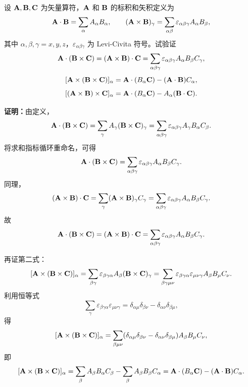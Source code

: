 \documentclass[12pt,a4paper]{article}
\begin{document}
\section{}
设 \(\vb{A},\vb{B},\vb{C}\) 为矢量算符，\(\vb{A}\) 和 \(\vb{B}\) 的标积和矢积定义为
\[
\vb{A}\cdot \vb{B}=\sum_{\alpha}A_{\alpha}B_{\alpha},
\qquad
(\vb{A}\times \vb{B})_{\gamma}=\sum_{\alpha\beta}\varepsilon_{\alpha\beta\gamma}A_{\alpha}B_{\beta},
\]
其中 \(\alpha,\beta,\gamma=x,y,z\)，\(\varepsilon_{\alpha\beta\gamma}\) 为 Levi-Civita 符号。试验证
\[
\vb{A}\cdot (\vb{B}\times \vb{C})=(\vb{A}\times \vb{B})\cdot \vb{C}=\sum_{\alpha\beta\gamma}\varepsilon_{\alpha\beta\gamma}A_{\alpha}B_{\beta}C_{\gamma},
\]
\[
[\vb{A}\times (\vb{B}\times \vb{C})]_{\alpha}=\vb{A}\cdot(B_{\alpha}\vb{C})-(\vb{A}\cdot \vb{B})C_{\alpha},
\]
\[
[(\vb{A}\times \vb{B})\times \vb{C}]_{\alpha}=\vb{A}\cdot(B_{\alpha}\vb{C})-A_{\alpha}(\vb{B}\cdot \vb{C}).
\]

\vspace{0.5cm}

\noindent\textbf{证明：}由定义，
\[
\vb{A}\cdot (\vb{B}\times \vb{C})
=
\sum_{\gamma}A_{\gamma}(\vb{B}\times \vb{C})_{\gamma}
=
\sum_{\alpha\beta\gamma}\varepsilon_{\alpha\beta\gamma}A_{\gamma}B_{\alpha}C_{\beta}.
\]
将求和指标循环重命名，可得
\[
\vb{A}\cdot (\vb{B}\times \vb{C})
=
\sum_{\alpha\beta\gamma}\varepsilon_{\alpha\beta\gamma}A_{\alpha}B_{\beta}C_{\gamma}.
\]
同理，
\[
(\vb{A}\times \vb{B})\cdot \vb{C}
=
\sum_{\gamma}(\vb{A}\times \vb{B})_{\gamma}C_{\gamma}
=
\sum_{\alpha\beta\gamma}\varepsilon_{\alpha\beta\gamma}A_{\alpha}B_{\beta}C_{\gamma}.
\]
故
\[
\vb{A}\cdot (\vb{B}\times \vb{C})
=
(\vb{A}\times \vb{B})\cdot \vb{C}
=
\sum_{\alpha\beta\gamma}\varepsilon_{\alpha\beta\gamma}A_{\alpha}B_{\beta}C_{\gamma}.
\]

再证第二式：
\[
[\vb{A}\times (\vb{B}\times \vb{C})]_{\alpha}
=
\sum_{\beta\gamma}\varepsilon_{\beta\gamma\alpha}A_{\beta}(\vb{B}\times \vb{C})_{\gamma}
=
\sum_{\beta\gamma\mu\nu}\varepsilon_{\beta\gamma\alpha}\varepsilon_{\mu\nu\gamma}A_{\beta}B_{\mu}C_{\nu}.
\]
利用恒等式
\[
\sum_{\gamma}\varepsilon_{\beta\gamma\alpha}\varepsilon_{\mu\nu\gamma}
=
\delta_{\alpha\mu}\delta_{\beta\nu}-\delta_{\alpha\nu}\delta_{\beta\mu},
\]
得
\[
[\vb{A}\times (\vb{B}\times \vb{C})]_{\alpha}
=
\sum_{\beta\mu\nu}
(\delta_{\alpha\mu}\delta_{\beta\nu}-\delta_{\alpha\nu}\delta_{\beta\mu})
A_{\beta}B_{\mu}C_{\nu},
\]
即
\[
[\vb{A}\times (\vb{B}\times \vb{C})]_{\alpha}
=
\sum_{\beta}A_{\beta}B_{\alpha}C_{\beta}
-
\sum_{\beta}A_{\beta}B_{\beta}C_{\alpha}
=
\vb{A}\cdot (B_{\alpha}\vb{C})-(\vb{A}\cdot \vb{B})C_{\alpha}.
\]
\end{document}
